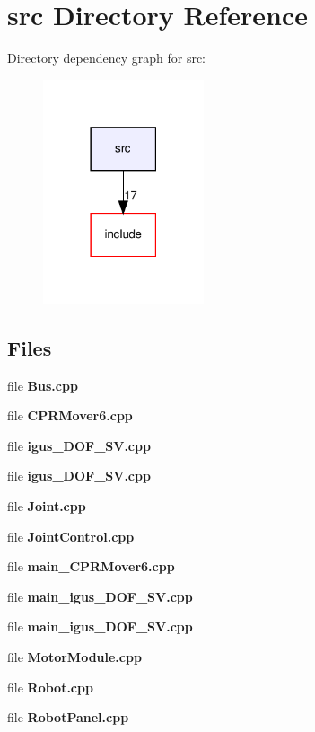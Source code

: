 \section{src Directory Reference}
\label{dir_68267d1309a1af8e8297ef4c3efbcdba}
Directory dependency graph for src\+:
\nopagebreak
\begin{figure}[H]
\begin{center}
\leavevmode
\includegraphics[width=134pt]{dir_68267d1309a1af8e8297ef4c3efbcdba_dep}
\end{center}
\end{figure}
\subsection*{Files}
\begin{DoxyCompactItemize}
\item 
file \textbf{ Bus.\+cpp}
\item 
file \textbf{ C\+P\+R\+Mover6.\+cpp}
\item 
file \textbf{ igus\+\_\+D\+O\+F\+\_\+\+S\+V.\+cpp}
\item 
file \textbf{ igus\+\_\+D\+O\+F\+\_\+\+S\+V.\+cpp}
\item 
file \textbf{ Joint.\+cpp}
\item 
file \textbf{ Joint\+Control.\+cpp}
\item 
file \textbf{ main\+\_\+\+C\+P\+R\+Mover6.\+cpp}
\item 
file \textbf{ main\+\_\+igus\+\_\+D\+O\+F\+\_\+\+S\+V.\+cpp}
\item 
file \textbf{ main\+\_\+igus\+\_\+D\+O\+F\+\_\+\+S\+V.\+cpp}
\item 
file \textbf{ Motor\+Module.\+cpp}
\item 
file \textbf{ Robot.\+cpp}
\item 
file \textbf{ Robot\+Panel.\+cpp}
\end{DoxyCompactItemize}
